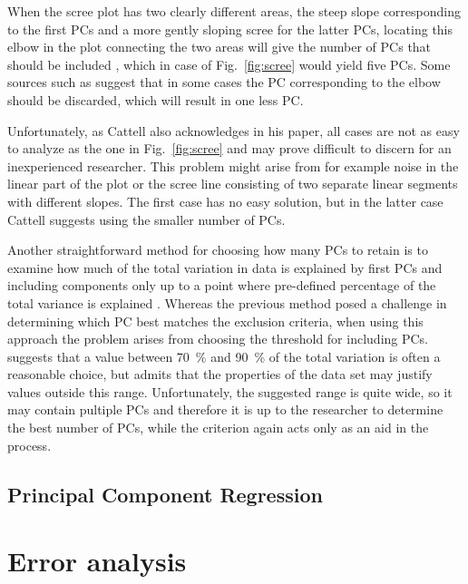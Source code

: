 \documentclass[english, oneside]{HYgradu}
\begin{document}
When the scree plot has two clearly different areas, the steep slope corresponding to the first PCs and a more gently sloping scree for the latter PCs, locating this elbow in the plot connecting the two areas will give the number of PCs that should be included \citep{jolliffe2002principal}, which in case of Fig.\ \ref{fig:scree} would yield five PCs. Some sources such as \citep{cattell1966scree} suggest that in some cases the PC corresponding to the elbow should be discarded, which will result in one less PC.

Unfortunately, as Cattell also acknowledges in his paper, all cases are not as easy to analyze as the one in Fig.\ \ref{fig:scree} and may prove difficult to discern for an inexperienced researcher. This problem might arise from for example noise in the linear part of the plot or the scree line consisting of two separate linear segments with different slopes. The first case has no easy solution, but in the latter case Cattell suggests using the smaller number of PCs.

Another straightforward method for choosing how many PCs to retain is to examine how much of the total variation in data is explained by first PCs and including components only up to a point where pre-defined percentage of the total variance is explained \citep{jolliffe2002principal}. Whereas the previous method posed a challenge in determining which PC best matches the exclusion criteria, when using this approach the problem arises from choosing the threshold for including PCs. \citet{jolliffe2002principal} suggests that a value between 70~\% and 90~\% of the total variation is often a reasonable choice, but admits that the properties of the data set may justify values outside this range. Unfortunately, the suggested range is quite wide, so it may contain pultiple PCs and therefore it is up to the researcher to determine the best number of PCs, while the criterion again acts only as an aid in the process. 



\subsection{Principal Component Regression}

\section{Error analysis}
\end{document}
